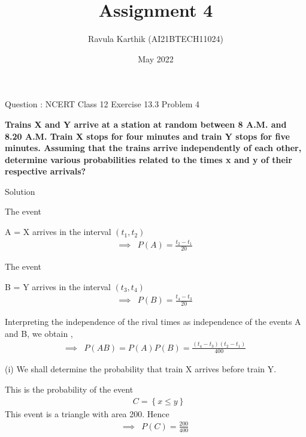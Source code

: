 \documentclass[journal,12pt,twocolumn]{beamer}
\title{Assignment 4}
\author{Ravula Karthik (AI21BTECH11024)}
\date {May 2022}
\providecommand{\cbrak}[1]{\ensuremath{\left\{#1\right\}}}
\begin{document}
	\begin{frame}
		\titlepage 
	\end{frame}
	
	\begin{frame}{Question : NCERT Class 12 Exercise 13.3 Problem 4}
		
		\textbf{Trains X and Y arrive at a station at random between 8 A.M. and 8.20 A.M. Train
			X stops for four minutes and train Y stops for five minutes. Assuming that the trains
			arrive independently of each other, determine various probabilities related to the times x and y of their respective arrivals? }
	\end{frame}
	\begin{frame}{Solution}
		
	 The event 
	
	A =  X  arrives in the interval  $ (t_1 , t_2) $ 
	\begin{align}
		\implies	&P(A) = \frac{t_2 -t_1}{20} 
	\end{align} 

  The event
 
 B =  Y arrives in the interval  $ (t_3 , t_4) $
 \begin{align}
 	\implies	&P(B) = \frac{t_4 -t_3}{20} 
 \end{align} 
 
 Interpreting the independence of the rival
 times as independence of the events A and B, we obtain ,
 \begin{align}
 	\implies	&P(AB) = P(A)P(B) = \frac{(t_4 -t_3)(t_2 -t_1 )}{400} 
 \end{align} 
	
	\end{frame}
	\begin{frame}
	
			(i) We shall determine the probability that train X arrives before train Y.
			
			This is the probability of the event
			\begin{align}
				&C = \cbrak{x \leq y } \nonumber
			\end{align} 
			This event is a triangle with area 200. Hence
			\begin{align}
				\implies    &P(C) = \frac{200}{400} 
			\end{align}
	\end{frame}
		
\end{document}
